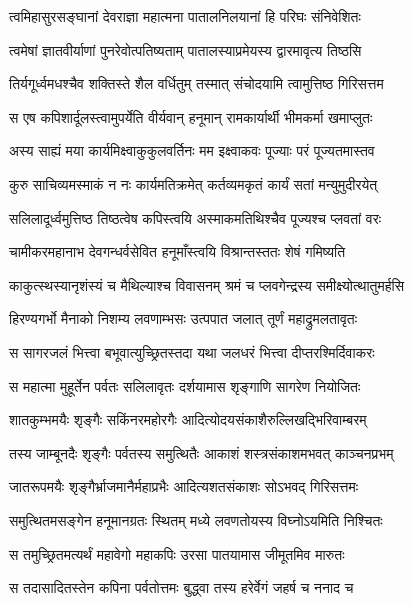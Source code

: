 \twolineshloka
{त्वमिहासुरसङ्घानां देवराज्ञा महात्मना}
{पातालनिलयानां हि परिघः संनिवेशितः} %

\twolineshloka
{त्वमेषां ज्ञातवीर्याणां पुनरेवोत्पतिष्यताम्}
{पातालस्याप्रमेयस्य द्वारमावृत्य तिष्ठसि} %

\twolineshloka
{तिर्यगूर्ध्वमधश्चैव शक्तिस्ते शैल वर्धितुम्}
{तस्मात् संचोदयामि त्वामुत्तिष्ठ गिरिसत्तम} %

\twolineshloka
{स एष कपिशार्दूलस्त्वामुपर्येति वीर्यवान्}
{हनूमान् रामकार्यार्थी भीमकर्मा खमाप्लुतः} %

\twolineshloka
{अस्य साह्यं मया कार्यमिक्ष्वाकुकुलवर्तिनः}
{मम इक्ष्वाकवः पूज्याः परं पूज्यतमास्तव} %

\twolineshloka
{कुरु साचिव्यमस्माकं न नः कार्यमतिक्रमेत्}
{कर्तव्यमकृतं कार्यं सतां मन्युमुदीरयेत्} %

\twolineshloka
{सलिलादूर्ध्वमुत्तिष्ठ तिष्ठत्वेष कपिस्त्वयि}
{अस्माकमतिथिश्चैव पूज्यश्च प्लवतां वरः} %

\twolineshloka
{चामीकरमहानाभ देवगन्धर्वसेवित}
{हनूमाँस्त्वयि विश्रान्तस्ततः शेषं गमिष्यति} %

\twolineshloka
{काकुत्स्थस्यानृशंस्यं च मैथिल्याश्च विवासनम्}
{श्रमं च प्लवगेन्द्रस्य समीक्ष्योत्थातुमर्हसि} %

\twolineshloka
{हिरण्यगर्भो मैनाको निशम्य लवणाम्भसः}
{उत्पपात जलात् तूर्णं महाद्रुमलतावृतः} %

\twolineshloka
{स सागरजलं भित्त्वा बभूवात्युच्छ्रितस्तदा}
{यथा जलधरं भित्त्वा दीप्तरश्मिर्दिवाकरः} %

\twolineshloka
{स महात्मा मुहूर्तेन पर्वतः सलिलावृतः}
{दर्शयामास शृङ्गाणि सागरेण नियोजितः} %

\twolineshloka
{शातकुम्भमयैः शृङ्गैः सकिंनरमहोरगैः}
{आदित्योदयसंकाशैरुल्लिखद्भिरिवाम्बरम्} %

\twolineshloka
{तस्य जाम्बूनदैः शृङ्गैः पर्वतस्य समुत्थितैः}
{आकाशं शस्त्रसंकाशमभवत् काञ्चनप्रभम्} %

\twolineshloka
{जातरूपमयैः शृङ्गैर्भ्राजमानैर्महाप्रभैः}
{आदित्यशतसंकाशः सोऽभवद् गिरिसत्तमः} %

\twolineshloka
{समुत्थितमसङ्गेन हनूमानग्रतः स्थितम्}
{मध्ये लवणतोयस्य विघ्नोऽयमिति निश्चितः} %

\twolineshloka
{स तमुच्छ्रितमत्यर्थं महावेगो महाकपिः}
{उरसा पातयामास जीमूतमिव मारुतः} %

\twolineshloka
{स तदासादितस्तेन कपिना पर्वतोत्तमः}
{बुद्ध्वा तस्य हरेर्वेगं जहर्ष च ननाद च} %

